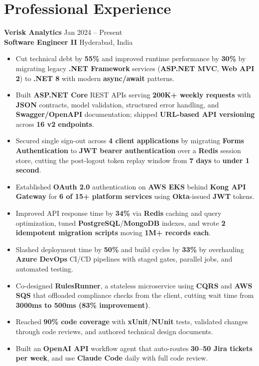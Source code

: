 \documentclass[a4paper,10pt]{article}
\begin{document}
\section*{Professional Experience}

\textbf{Verisk Analytics} \hfill Jan 2024 -- Present \\
\textbf{Software Engineer II} \hfill Hyderabad, India

\begin{itemize}[leftmargin=*]
    \item Cut technical debt by \textbf{55\%} and improved runtime performance by \textbf{30\%} by migrating legacy \textbf{.NET Framework} services (\textbf{ASP.NET MVC}, \textbf{Web API 2}) to \textbf{.NET 8} with modern \textbf{async/await} patterns.
    \item Built \textbf{ASP.NET Core} REST APIs serving \textbf{200K+ weekly requests} with \textbf{JSON} contracts, model validation, structured error handling, and \textbf{Swagger/OpenAPI} documentation; shipped \textbf{URL-based API versioning} across \textbf{16 v2 endpoints}.
    \item Secured single sign-out across \textbf{4 client applications} by migrating \textbf{Forms Authentication} to \textbf{JWT bearer authentication} over a \textbf{Redis} session store, cutting the post-logout token replay window from \textbf{7 days} to \textbf{under 1 second}.
    \item Established \textbf{OAuth 2.0} authentication on \textbf{AWS EKS} behind \textbf{Kong API Gateway} for \textbf{6 of 15+ platform services} using \textbf{Okta}-issued \textbf{JWT} tokens.
    \item Improved API response time by \textbf{34\%} via \textbf{Redis} caching and query optimization, tuned \textbf{PostgreSQL}/\textbf{MongoDB} indexes, and wrote \textbf{2 idempotent migration scripts} moving \textbf{1M+ records each}.
    \item Slashed deployment time by \textbf{50\%} and build cycles by \textbf{33\%} by overhauling \textbf{Azure DevOps} CI/CD pipelines with staged gates, parallel jobs, and automated testing.
    \item Co-designed \textbf{RulesRunner}, a stateless microservice using \textbf{CQRS} and \textbf{AWS SQS} that offloaded compliance checks from the client, cutting wait time from \textbf{3000ms to 500ms (83\% improvement)}.
    \item Reached \textbf{90\% code coverage} with \textbf{xUnit}/\textbf{NUnit} tests, validated changes through code reviews, and authored technical design documents.
    \item Built an \textbf{OpenAI API} workflow agent that auto-routes \textbf{30--50 Jira tickets per week}, and use \textbf{Claude Code} daily with full code review.
\end{itemize}
\end{document}

